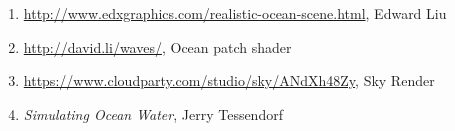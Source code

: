 \documentclass{jcgt}
\begin{document}
\begin{enumerate}
\item \label{enum:e1} \href{http://www.edxgraphics.com/realistic-ocean-scene.html}{http://www.edxgraphics.com/realistic-ocean-scene.html}, Edward Liu
\item \label{enum:e2} \href{http://david.li/waves/}{http://david.li/waves/}, Ocean patch shader
\item \label{enum:e3} \href{https://www.cloudparty.com/studio/sky/ANdXh48Zy}{https://www.cloudparty.com/studio/sky/ANdXh48Zy}, Sky Render
\item \label{enum:e4} \textit{Simulating Ocean Water}, Jerry Tessendorf

\end{enumerate}



%


\end{document}
